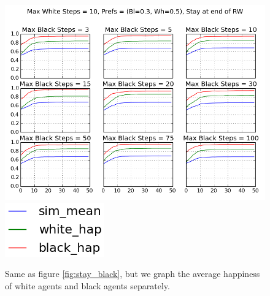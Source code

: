 \documentclass[11pt,twoside]{amsart}
\theoremstyle{theorem}
\theoremstyle{definition}
\theoremstyle{remark}
\begin{document}
    \begin{figure}[p]
        \center
        \includegraphics[scale=0.60]{stay_at_end_rw_change_black_max_decompose_happiness.png}
        \includegraphics[scale=0.60]{stay_at_end_rw_change_black_max_decompose_happiness_legend.png}
        \caption{Same as figure \ref{fig:stay_black}, but we graph the average happiness of white agents and black agents separately.}
        \label{fig:stay_black_decomposed}
    \end{figure}
\end{document}

